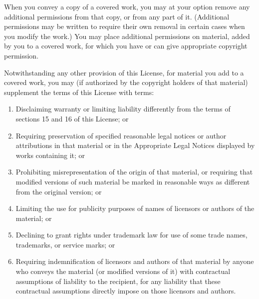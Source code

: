 \documentclass[11pt]{article}
\begin{document}
\begin{enumerate}
          When you convey a copy of a covered work, you may at your option
          remove any additional permissions from that copy, or from any part of
          it.  (Additional permissions may be written to require their own
          removal in certain cases when you modify the work.)  You may place
          additional permissions on material, added by you to a covered work,
          for which you have or can give appropriate copyright permission.

          Notwithstanding any other provision of this License, for material you
          add to a covered work, you may (if authorized by the copyright holders of
          that material) supplement the terms of this License with terms:
          \begin{enumerate}
              \item Disclaiming warranty or limiting liability differently from the
                    terms of sections 15 and 16 of this License; or

              \item Requiring preservation of specified reasonable legal notices or
                    author attributions in that material or in the Appropriate Legal
                    Notices displayed by works containing it; or

              \item Prohibiting misrepresentation of the origin of that material, or
                    requiring that modified versions of such material be marked in
                    reasonable ways as different from the original version; or

              \item Limiting the use for publicity purposes of names of licensors or
                    authors of the material; or

              \item Declining to grant rights under trademark law for use of some
                    trade names, trademarks, or service marks; or

              \item Requiring indemnification of licensors and authors of that
                    material by anyone who conveys the material (or modified versions of
                    it) with contractual assumptions of liability to the recipient, for
                    any liability that these contractual assumptions directly impose on
                    those licensors and authors.
          \end{enumerate}


\end{enumerate}
\end{document}

